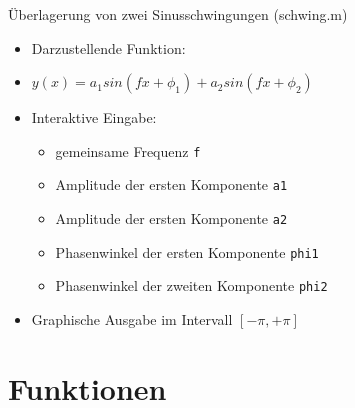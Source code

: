  \secMexercise
  \begin{frame}
      \frameMexercise
      \begin{exercise}
          \sloppy
          Überlagerung von zwei Sinusschwingungen (schwing.m)
          \begin{itemize}
            \item Darzustellende Funktion:
            \item $ y(x) = a_{1}sin(fx + \phi_{1}) + a_{2}sin(fx + \phi_{2})$
            \item Interaktive Eingabe:
            \begin{itemize}
              \item gemeinsame Frequenz \texttt{f}
              \item Amplitude der ersten Komponente \texttt{a1}
              \item Amplitude der ersten Komponente \texttt{a2}
              \item Phasenwinkel der ersten Komponente \texttt{phi1}
              \item Phasenwinkel der zweiten Komponente \texttt{phi2}
            \end{itemize}
            \item Graphische Ausgabe im Intervall $[-\pi,+\pi]$
          \end{itemize}
      \end{exercise}
  \end{frame}

  \section{Funktionen}

